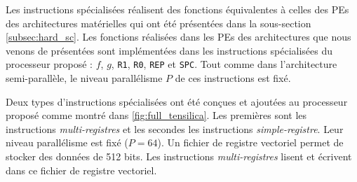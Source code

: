 Les instructions spécialisées réalisent des fonctions équivalentes à celles des PEs des architectures matérielles qui ont été présentées dans la sous-section \ref{subsec:hard_sc}. Les fonctions réalisées dans les PEs des architectures que nous venons de présentées sont implémentées dans les instructions spécialisées du processeur proposé : $f$, $g$, \texttt{R1}, \texttt{R0}, \texttt{REP} et \texttt{SPC}. Tout comme dans l'architecture semi-parallèle, le niveau parallélisme $P$ de ces instructions est fixé.

Deux types d'instructions spécialisées ont été conçues et ajoutées au processeur proposé comme montré dans \ref{fig:full_tensilica}. Les premières sont les instructions \textit{multi-registres} et les secondes les instructions \textit{simple-registre}. Leur niveau parallélisme est fixé ($P=64$). Un fichier de registre vectoriel permet de stocker des données de 512 bits. Les instructions \textit{multi-registres} lisent et écrivent dans ce fichier de registre vectoriel.

